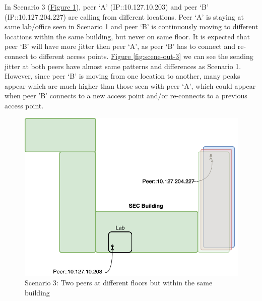 	In Scenario 3 (\hyperref[fig:scene-3]{Figure \ref{fig:scene-3}}), peer `A' (IP::10.127.10.203) and peer `B' (IP::10.127.204.227) are calling from different locations. Peer `A' is staying at same lab/office seen in Scenario 1 and peer `B' is continuously moving to different locations within the same building, but never on same floor. It is expected that peer `B' will have more jitter then peer `A', as peer `B' has to connect and re-connect to different access points. \hyperref[fig:scene-out-3]{Figure \ref{fig:scene-out-3}} we can see the sending jitter at both peers have almost same patterns and differences as Scenario 1. However, since peer `B' is moving from one location to another, many peaks appear which are much higher than those seen with peer `A', which could appear when peer 'B' connects to a new access point and/or re-connects to a previous access point.
	\begin{figure}[thb]
		\begin{minipage}{\textwidth}
			\includegraphics[scale=0.29]{Images/experiment/senarios/diff_floor.drawio.png}
		\end{minipage}
		\caption{Scenario 3: Two peers at different floors but within the same building}
		\label{fig:scene-3}
	\end{figure}

